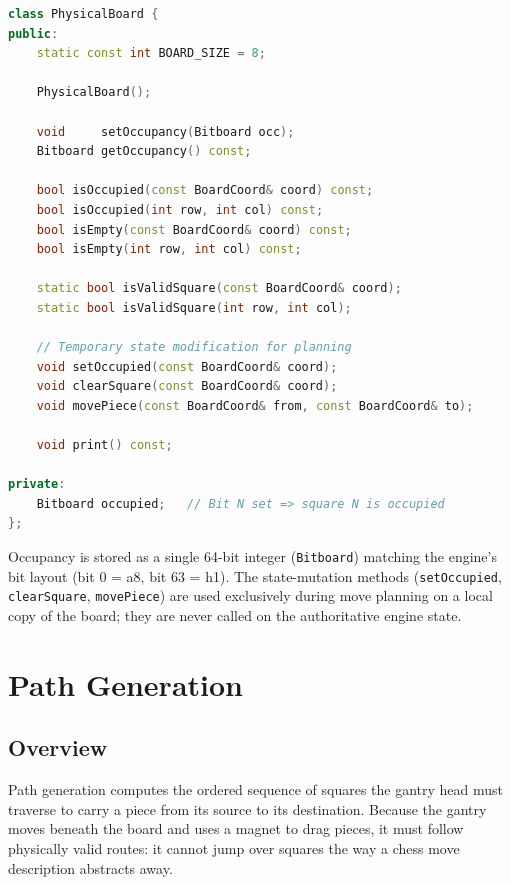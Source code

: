 \documentclass[11pt,a4paper]{report}
\begin{document}
\begin{lstlisting}[language=C++, caption={PhysicalBoard class}]
class PhysicalBoard {
public:
    static const int BOARD_SIZE = 8;

    PhysicalBoard();

    void     setOccupancy(Bitboard occ);
    Bitboard getOccupancy() const;

    bool isOccupied(const BoardCoord& coord) const;
    bool isOccupied(int row, int col) const;
    bool isEmpty(const BoardCoord& coord) const;
    bool isEmpty(int row, int col) const;

    static bool isValidSquare(const BoardCoord& coord);
    static bool isValidSquare(int row, int col);

    // Temporary state modification for planning
    void setOccupied(const BoardCoord& coord);
    void clearSquare(const BoardCoord& coord);
    void movePiece(const BoardCoord& from, const BoardCoord& to);

    void print() const;

private:
    Bitboard occupied;   // Bit N set => square N is occupied
};
\end{lstlisting}

Occupancy is stored as a single 64-bit integer (\texttt{Bitboard}) matching the engine's bit layout (bit 0 = a8, bit 63 = h1). The state-mutation methods (\texttt{setOccupied}, \texttt{clearSquare}, \texttt{movePiece}) are used exclusively during move planning on a local copy of the board; they are never called on the authoritative engine state.

\chapter{Path Generation}

\section{Overview}

Path generation computes the ordered sequence of squares the gantry head must traverse to carry a piece from its source to its destination. Because the gantry moves beneath the board and uses a magnet to drag pieces, it must follow physically valid routes: it cannot jump over squares the way a chess move description abstracts away.
\end{document}
